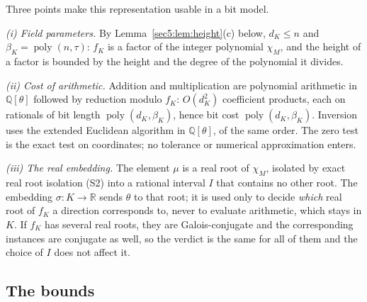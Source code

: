 \documentclass[journal]{IEEEtran}
\theoremstyle{plainn}
\theoremstyle{remark}
\newcommand{\poly}{\operatorname{poly}}
\begin{document}
Three points make this representation usable in a bit model.

\emph{(i) Field parameters.} By Lemma~\ref{sec5:lem:height}(c) below, $d_K\le n$ and
$\beta_K=\poly(n,\tau)$: $f_K$ is a factor of the integer polynomial $\chi_M$, and the height of a
factor is bounded by the height and the degree of the polynomial it divides.

\emph{(ii) Cost of arithmetic.} Addition and multiplication are polynomial arithmetic in
$\mathbb{Q}[\theta]$ followed by reduction modulo $f_K$: $O(d_K^{2})$ coefficient products, each on
rationals of bit length $\poly(d_K,\beta_K)$, hence bit cost $\poly(d_K,\beta_K)$. Inversion uses the
extended Euclidean algorithm in $\mathbb{Q}[\theta]$, of the same order. The zero test is the exact
test on coordinates; no tolerance or numerical approximation enters.

\emph{(iii) The real embedding.} The element $\mu$ is a real root of $\chi_M$, isolated by exact real
root isolation (S2) into a rational interval $I$ that contains no other root. The embedding
$\sigma\colon K\to\mathbb{R}$ sends $\theta$ to that root; it is used only to decide \emph{which} real
root of $f_K$ a direction corresponds to, never to evaluate arithmetic, which stays in $K$. If $f_K$
has several real roots, they are Galois-conjugate and the corresponding instances are conjugate as well,
so the verdict is the same for all of them and the choice of $I$ does not affect it.


\subsection{The bounds}\label{sec5:sub:height}\label{sec5:sub:charpoly}\label{sec5:sub:eigvec}
\end{document}
